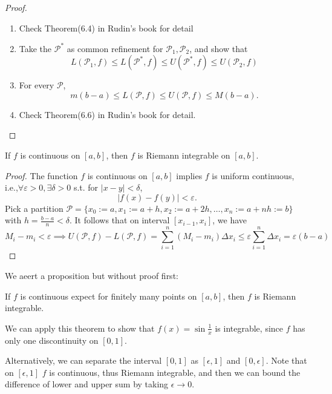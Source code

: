 \begin{proof}
\begin{enumerate}
\item
Check Theorem(6.4) in Rudin's book for detail
\item
Take the $\mathcal{P}^*$ as common refinement for $\mathcal{P}_1,\mathcal{P}_2$, and show that
\[
L(\mathcal{P}_1,f)\le 
L(\mathcal{P}^*,f)\le U(\mathcal{P}^*,f)\le
U(\mathcal{P}_2,f)
\]
\item
For every $\mathcal{P}$,
\[
m(b-a)\le L(\mathcal{P},f)\le U(\mathcal{P},f)\le M(b-a).
\]
\item
Check Theorem(6.6) in Rudin's book for detail.
\end{enumerate}
\end{proof}
\begin{theorem}
If $f$ is continuous on $[a,b]$, then $f$ is Riemann integrable on $[a,b]$.
\end{theorem}

\begin{proof}
The function $f$ is continuous on $[a,b]$ implies $f$ is uniform continuous, i.e.,$\forall \varepsilon>0,\exists\delta>0$ s.t. for $|x-y|<\delta$,
\[
|f(x)-f(y)|<\varepsilon.
\]
Pick a partition $\mathcal{P}=\{x_0:=a,x_1:=a+h,x_2:=a+2h,\dots,x_n:=a+nh:=b\}$ with $h=\frac{b-a}{n}<\delta$. It follows that on interval $[x_{i-1},x_i]$, we have
\[
M_i-m_i<\varepsilon\implies
U(\mathcal{P},f) - L(\mathcal{P},f) = \sum_{i=1}^n(M_i-m_i)\Delta x_i\le\varepsilon\sum_{i=1}^n\Delta x_i=\varepsilon(b-a)
\]
\end{proof}
We aeert a proposition but without proof first:
\begin{corollary}
If $f$ is continuous expect for finitely many points on $[a,b]$, then $f$ is Riemann integrable.
\end{corollary}
We can apply this theorem to show that $f(x)=\sin\frac{1}{x}$ is integrable, since $f$ has only one discontinuity on $[0,1]$. 

Alternatively, we can separate the interval $[0,1]$ as $[\epsilon,1]$ and $[0,\epsilon]$. Note that on $[\epsilon,1]$ $f$ is continuous, thus Riemann integrable, and then we can bound the difference of lower and upper sum by taking $\epsilon\to0$.

